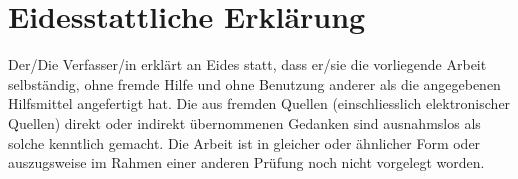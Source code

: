 \documentclass[11pt,a4paper,english,oneside]{book}
\begin{document}
\newpage
\thispagestyle{firststyle}
\section*{Eidesstattliche Erklärung}
Der/Die Verfasser/in erklärt an Eides statt, dass er/sie die vorliegende Arbeit selbständig, ohne fremde Hilfe und ohne Benutzung anderer als die angegebenen Hilfsmittel angefertigt hat. Die aus fremden Quellen (einschliesslich elektronischer Quellen) direkt oder indirekt übernommenen Gedanken sind ausnahmslos als solche kenntlich gemacht. Die Arbeit ist in gleicher oder ähnlicher Form oder auszugsweise im Rahmen einer anderen Prüfung noch nicht vorgelegt worden.\\[2cm]
 \hfill {}
\end{document}
